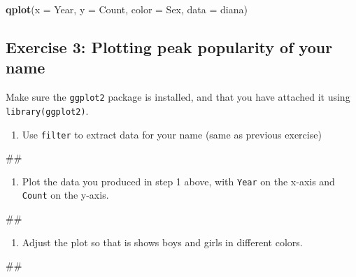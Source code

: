 \documentclass[]{book}
\newenvironment{Shaded}{\begin{snugshade}}{\end{snugshade}}
\newcommand{\KeywordTok}[1]{\textcolor[rgb]{0.13,0.29,0.53}{\textbf{#1}}}
\newcommand{\DataTypeTok}[1]{\textcolor[rgb]{0.13,0.29,0.53}{#1}}
\newcommand{\NormalTok}[1]{#1}
\providecommand{\tightlist}{%
  \setlength{\itemsep}{0pt}\setlength{\parskip}{0pt}}
\begin{document}
\begin{Shaded}
\begin{Highlighting}[]
\KeywordTok{qplot}\NormalTok{(}\DataTypeTok{x =}\NormalTok{ Year, }\DataTypeTok{y =}\NormalTok{ Count, }\DataTypeTok{color =}\NormalTok{ Sex,}
      \DataTypeTok{data =}\NormalTok{ diana)}
\end{Highlighting}
\end{Shaded}

\subsection{Exercise 3: Plotting peak popularity of your
name}\label{exercise-3-plotting-peak-popularity-of-your-name}

Make sure the \texttt{ggplot2} package is installed, and that you have
attached it using \texttt{library(ggplot2)}.

\begin{enumerate}
\def\labelenumi{\arabic{enumi}.}
\tightlist
\item
  Use \texttt{filter} to extract data for your name (same as previous
  exercise)
\end{enumerate}

\begin{Shaded}
\begin{Highlighting}[]
\NormalTok{##}
\end{Highlighting}
\end{Shaded}

\begin{enumerate}
\def\labelenumi{\arabic{enumi}.}
\setcounter{enumi}{1}
\tightlist
\item
  Plot the data you produced in step 1 above, with \texttt{Year} on the
  x-axis and \texttt{Count} on the y-axis.
\end{enumerate}

\begin{Shaded}
\begin{Highlighting}[]
\NormalTok{##}
\end{Highlighting}
\end{Shaded}

\begin{enumerate}
\def\labelenumi{\arabic{enumi}.}
\setcounter{enumi}{2}
\tightlist
\item
  Adjust the plot so that is shows boys and girls in different colors.
\end{enumerate}

\begin{Shaded}
\begin{Highlighting}[]
\NormalTok{##}
\end{Highlighting}
\end{Shaded}
\end{document}
